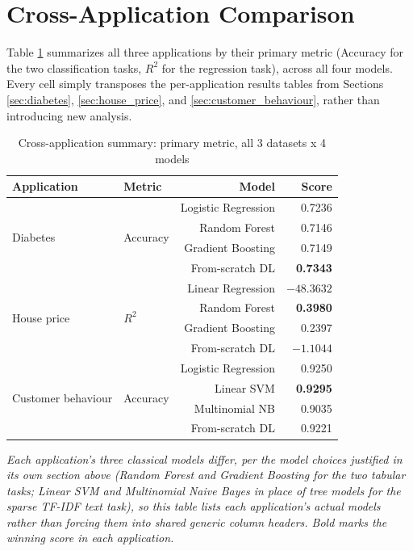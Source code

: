 \documentclass[11pt]{article}
\begin{document}
\newpage
\section{Cross-Application Comparison}
\label{sec:cross}

Table \ref{tab:cross-app} summarizes all three applications by their primary metric
(Accuracy for the two classification tasks, $R^2$ for the regression task), across all four
models. Every cell simply transposes the per-application results tables from Sections
\ref{sec:diabetes}, \ref{sec:house_price}, and \ref{sec:customer_behaviour}, rather than
introducing new analysis.

\begin{table}[H]
\centering
\caption{Cross-application summary: primary metric, all 3 datasets x 4 models}
\label{tab:cross-app}
\begin{tabular}{llrr}
\toprule
Application & Metric & Model & Score \\
\midrule
\multirow{4}{*}{Diabetes}
  & \multirow{4}{*}{Accuracy} & Logistic Regression & 0.7236 \\
  & & Random Forest & 0.7146 \\
  & & Gradient Boosting & 0.7149 \\
  & & From-scratch DL & \textbf{0.7343} \\
\midrule
\multirow{4}{*}{House price}
  & \multirow{4}{*}{$R^2$} & Linear Regression & $-48.3632$ \\
  & & Random Forest & \textbf{0.3980} \\
  & & Gradient Boosting & 0.2397 \\
  & & From-scratch DL & $-1.1044$ \\
\midrule
\multirow{4}{*}{Customer behaviour}
  & \multirow{4}{*}{Accuracy} & Logistic Regression & 0.9250 \\
  & & Linear SVM & \textbf{0.9295} \\
  & & Multinomial NB & 0.9035 \\
  & & From-scratch DL & 0.9221 \\
\bottomrule
\end{tabular}
\end{table}

\noindent\textit{Each application's three classical models differ, per the model choices
justified in its own section above (Random Forest and Gradient Boosting for the two
tabular tasks; Linear SVM and Multinomial Naive Bayes in place of tree models for the
sparse TF-IDF text task), so this table lists each application's actual models rather
than forcing them into shared generic column headers. Bold marks the winning score in
each application.}
\end{document}
